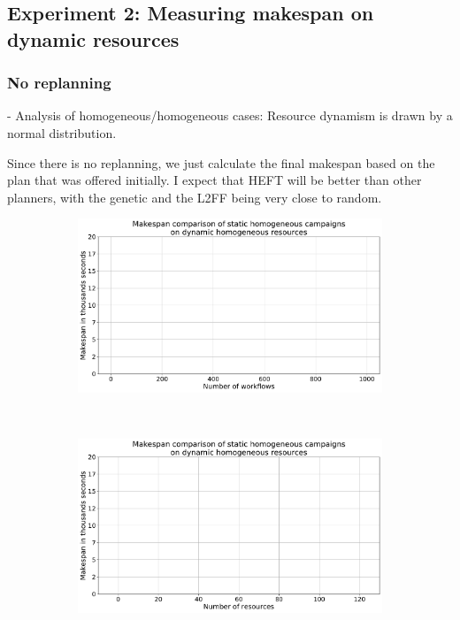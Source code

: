 \subsection{Experiment 2: Measuring makespan on dynamic resources}

\subsubsection{No replanning}

- Analysis of homogeneous/homogeneous cases: Resource dynamism is drawn by a normal distribution.

Since there is no replanning, we just calculate the final makespan based on the plan that was offered initially.
 I expect that HEFT will be better than other planners, with the genetic and the L2FF being very close to random.
\begin{figure}[ht!]
    \centering
    \begin{subfigure}[b]{0.45\textwidth}
        \includegraphics[width=.95\textwidth]{figures/campaign/StHomoCampaigns_4DyHomoResources.pdf}
        \caption{}
        \label{fig:StHomoCampaigns_4DyHomoResources}
    \end{subfigure}%
    ~ 
    \begin{subfigure}[b]{0.45\textwidth}
        \includegraphics[width=\linewidth]{figures/campaign/DyHomoResources_StHomoCampaigns.pdf}

\end{subfigure}
\end{figure}
